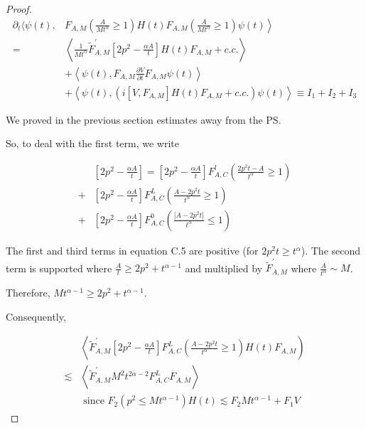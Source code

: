 \documentclass[11pt]{article}
\begin{document}
\begin{proof}

\begin{align*}
\partial_{t}\langle\psi(t), & \left.F_{A, M}\left(\frac{A}{M t^{\alpha}} \geq 1\right) H(t) F_{A, M}\left(\frac{A}{M t^{\alpha}} \geq 1\right) \psi(t)\right\rangle \\
= & \left\langle\frac{1}{M t^{\alpha}} \tilde{F}_{A, M}^{\prime}\left[2 p^{2}-\frac{\alpha A}{t}\right] H(t) F_{A, M}+c . c .\right\rangle \\
& +\left\langle\psi(t), F_{A, M} \frac{\partial V}{\partial t} F_{A, M} \psi(t)\right\rangle  \tag{C.4}\\
& +\left\langle\psi(t),\left(i\left[V, F_{A, M}\right] H(t) F_{A, M}+c . c .\right) \psi(t)\right\rangle \equiv I_{1}+I_{2}+I_{3}
\end{align*}


We proved in the previous section estimates away from the PS.

So, to deal with the first term, we write

\begin{align*}
& {\left[2 p^{2}-\frac{\alpha A}{t}\right]=\left[2 p^{2}-\frac{\alpha A}{t}\right] F_{A, C}^l\left(\frac{2 p^{2} t-A}{t^{\alpha}} \geqslant 1\right) } \\
+ & {\left[2 p^{2}-\frac{\alpha A}{t}\right] F_{A, C}^L\left(\frac{A-2 p^{2} t}{t^{\alpha}} \geqslant 1\right) } \\
+ & {\left[2 p^{2}-\frac{\alpha A}{t}\right] F_{A, C}^0\left(\frac{\left|A-2 p^{2} t\right|}{t^{\alpha}} \leq 1\right) } \tag{C.5}
\end{align*}


The first and third terms in equation  C.5 are positive (for $2p^2 t\geq t^{\alpha}$).
The second term is supported where $\frac{A}{t} \geqslant 2 p^{2}+t^{\alpha-1}$ and multiplied by $\tilde{F}_{A, M}^{'}$ where $\frac{A}{t^{\alpha}} \sim M$.

Therefore, $M t^{\alpha-1} \geqslant 2 p^{2}+t^{\alpha-1}$.

Consequently,

\begin{align*}
& \left\langle\tilde{F}_{A, M}^{\prime}\left[2 p^{2}-\frac{\alpha A}{t}\right] F_{A, C}^L\left(\frac{A-2 p^{2} t}{t^{\alpha}} \geqslant 1\right) H(t) F_{A, M}\right) \\
\lesssim & \left\langle\tilde{F}_{A, M}^{\prime} M^{2} t^{2 \alpha-2} F_{A, C}^L F_{A, M}\right\rangle  \tag{C.6}\\
& \text { since } F_{2}\left(p^{2} \leq M t^{\alpha-1}\right) H(t) \lesssim F_{2} M t^{\alpha-1}+F_{1} V
\end{align*}


\end{proof}
\end{document}
